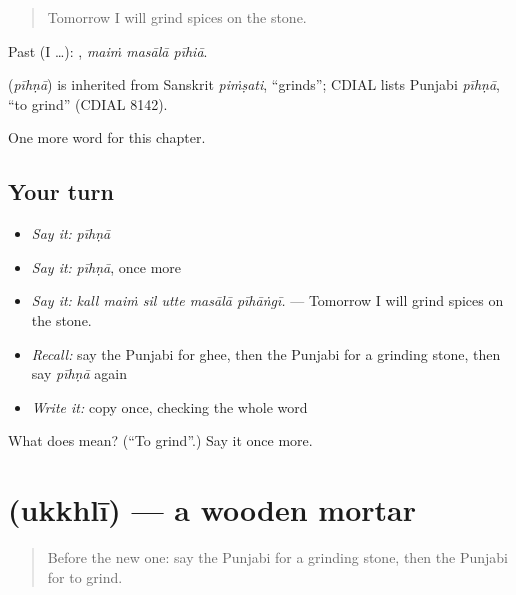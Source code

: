 \begin{quote}
Tomorrow I will grind spices on the stone.
\end{quote}

Past (I …):   , \emph{maiṁ masālā pīhiā}.

\begin{cousinweb}
\textbf{} (\emph{pīhṇā}) is inherited from Sanskrit \emph{piṁṣati}, \textquotedblleft{}grinds\textquotedblright{}; CDIAL lists Punjabi \emph{pīhṇā}, \textquotedblleft{}to grind\textquotedblright{} (CDIAL 8142).
\end{cousinweb}

\begin{grammarlens}[title={What you've built}]
One more word for this chapter.
\end{grammarlens}

\subsection*{Your turn}
\begin{itemize}
\raggedright
  \item \emph{Say it:} \emph{pīhṇā}
  \item \emph{Say it:} \emph{pīhṇā}, once more
  \item \emph{Say it:} \emph{kall maiṁ sil utte masālā pīhāṅgī.} — Tomorrow I will grind spices on the stone.
  \item \emph{Recall:} say the Punjabi for ghee, then the Punjabi for a grinding stone, then say \emph{pīhṇā} again
  \item \emph{Write it:} copy \textbf{} once, checking the whole word
\end{itemize}

\begin{tcolorbox}[breakable,colback=teal!4,colframe=teal!35!black,title={Before you move on}]
What does  mean? (\textquotedblleft{}To grind\textquotedblright{}.) Say it once more.
\end{tcolorbox}
\section[\texorpdfstring{\pa{ਉੱਖਲੀ} (ukkhlī)}{ਉੱਖਲੀ (ukkhlī)}]{ (ukkhlī) — a wooden mortar}

\label{lesson:PA-C240-ukkhli}



\begin{quote}
Before the new one: say the Punjabi for a grinding stone, then the Punjabi for to grind.
\end{quote}

